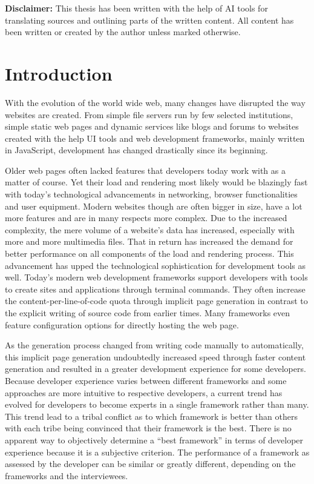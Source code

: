 \documentclass[a4paper, 12pt]{article}
\providecommand{\keywords}[1]
{
  {
    \footnotesize
    \textit{\textbf{Keywords ---} #1}
  } 
}
\begin{document}

\vfill

\noindent\textbf{Disclaimer:} This thesis has been written with the help of AI tools for translating sources and outlining parts of the written content.
All content has been written or created by the author unless marked otherwise.

\pagebreak

\tableofcontents
\pagebreak

\section{Introduction}\label{sec:introduction}
With the evolution of the world wide web, many changes have disrupted the way websites are created.
From simple file servers run by few selected institutions, simple static web pages and dynamic services like blogs and forums to websites created with the help UI tools and web development frameworks, mainly written in JavaScript, development has changed drastically since its beginning.

Older web pages often lacked features that developers today work with as a matter of course.
Yet their load and rendering most likely would be blazingly fast with today's technological advancements in networking, browser functionalities and user equipment.
Modern websites though are often bigger in size, have a lot more features and are in many respects more complex.
Due to the increased complexity, the mere volume of a website's data has increased, especially with more and more multimedia files.
That in return has increased the demand for better performance on all components of the load and rendering process.
This advancement has upped the technological sophistication for development tools as well.
Today's modern web development frameworks support developers with tools to create sites and applications through terminal commands.
They often increase the content-per-line-of-code quota through implicit page generation in contrast to the explicit writing of source code from earlier times.
Many frameworks even feature configuration options for directly hosting the web page.

As the generation process changed from writing code manually to automatically, this implicit page generation undoubtedly increased speed through faster content generation and resulted in a greater development experience for some developers.
Because developer experience varies between different frameworks and some approaches are more intuitive to respective developers, a current trend has evolved for developers to become experts in a single framework rather than many.
This trend lead to a tribal conflict as to which framework is better than others with each tribe being convinced that their framework is the best.
There is no apparent way to objectively determine a \enquote{best framework} in terms of developer experience because it is a subjective criterion.
The performance of a framework as assessed by the developer can be similar or greatly different, depending on the frameworks and the interviewees.
\end{document}

